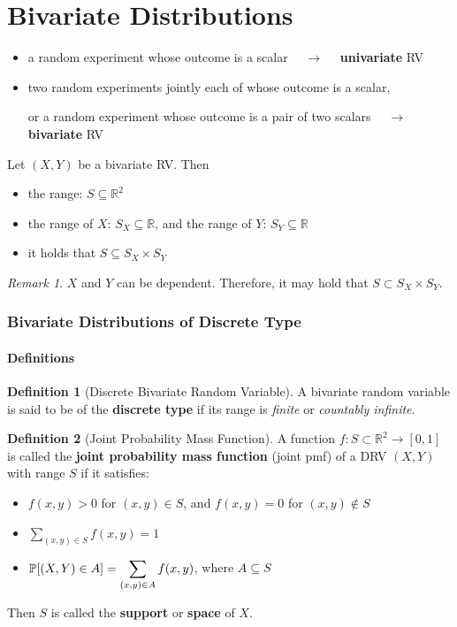 \documentclass[10pt,UTF8]{article}
\newenvironment{definition box}
{\begin{tcolorbox}[colback=blue!5!white,colframe=blue!75!black,parbox=false,before upper=\par,before lower=\par]}
{\end{tcolorbox}}
\newenvironment{theorem box}
{\begin{tcolorbox}[colback=yellow!5!white,colframe=yellow!75!black,parbox=false,before upper=\par,before lower=\par]}
{\end{tcolorbox}}
\theoremstyle{definition}
\newtheorem{definition inner}{Definition}[section]
\newenvironment{definition}[1][]
{\begin{definition box}\begin{definition inner}[#1]\hfill\par}
{\end{definition inner}\end{definition box}}
\theoremstyle{plain}
\newtheorem{theorem inner}{Theorem}[section]
\theoremstyle{definition}
\newtheorem*{proof inner}{\textit{Proof}}
\theoremstyle{remark}
\newtheorem*{remark}{\textit{Remark}}
\newcommand{\Prob}{\mathbb{P}\qty}
\begin{document}
\part*{Bivariate Distributions}

\begin{itemize}
    \item a random experiment whose outcome is a scalar
    $\quad\rightarrow\quad$ \textbf{univariate} RV
    \item two random experiments jointly each of whose outcome is a
    scalar,
    
    or a random experiment whose outcome is a pair of
    two scalars $\quad\rightarrow\quad$ \textbf{bivariate} RV
\end{itemize}

\noindent
Let $(X,Y)$ be a bivariate RV. Then
\begin{itemize}
    \item the range: $S\subseteq\mathbb{R}^2$
    \item the range of $X$: $S_X\subseteq\mathbb{R}$,
    and the range of $Y$: $S_Y\subseteq\mathbb{R}$
    \item it holds that $S\subseteq S_X\times S_Y$
\end{itemize}
\begin{remark}
    $X$ and $Y$ can be dependent. Therefore, it may hold that
    $S\subset S_X\times S_Y$.
\end{remark}


\section{Bivariate Distributions of Discrete Type}

\subsection{Definitions}

\begin{definition}[Discrete Bivariate Random Variable]
    A bivariate random variable is said to be of the \textbf{discrete type}
    if its range is \emph{finite} or \emph{countably infinite}.
\end{definition}

\begin{definition}[Joint Probability Mass Function]
    A function $f\colon S\subset\mathbb{R}^2\rightarrow[0,1]$
    is called the \textbf{joint probability mass function} (joint pmf) of
    a DRV $(X,Y)$ with range $S$ if it satisfies:
    \begin{itemize}
        \item $f(x,y)>0$ for $(x,y)\in S$,
        and $f(x,y)=0$ for $(x,y)\notin S$
        \item $\displaystyle\sum_{(x,y)\in S}f(x,y)=1$
        \item $\displaystyle \Prob[(X,Y)\in A]=\sum_{(x,y)\in A}f(x,y)$, where $A\subseteq S$
    \end{itemize}
    Then $S$ is called the \textbf{support} or \textbf{space} of $X$.
\end{definition}
\end{document}
